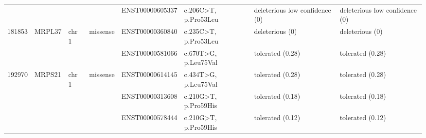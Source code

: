 \documentclass[fleqn,10pt]{wlscirep}
\begin{document}
\begin{landscape}
\begin{table}[]
{\begin{tabular}{|l|l|l|l|l|l|l|l|}
{\color[HTML]{000000} }                         & {\color[HTML]{000000} }                         & {\color[HTML]{000000} }                         & {\color[HTML]{000000} }                           & {\color[HTML]{000000} ENST00000605337}     & {\color[HTML]{000000} c.206C\textgreater{}T, p.Pro53Leu}   & {\color[HTML]{000000} deleterious low confidence (0)}    & deleterious low confidence (0)    \\ \cline{5-8} 
\multirow{-2}{*}{{\color[HTML]{000000} 181853}} & \multirow{-2}{*}{{\color[HTML]{000000} MRPL37}} & \multirow{-2}{*}{{\color[HTML]{000000} chr 1}}  & \multirow{-2}{*}{{\color[HTML]{000000} missense}} & {\color[HTML]{000000} ENST00000360840}     & {\color[HTML]{000000} c.235C\textgreater{}T, p.Pro53Leu}   & {\color[HTML]{000000} deleterious (0)}                   & deleterious (0)                   \\ \hline
{\color[HTML]{000000} }                         & {\color[HTML]{000000} }                         & {\color[HTML]{000000} }                         & {\color[HTML]{000000} }                           & {\color[HTML]{000000} ENST00000581066}     & {\color[HTML]{000000} c.670T\textgreater{}G, p.Leu75Val}   & {\color[HTML]{000000} tolerated (0.28)}                  & tolerated (0.28)                  \\ \cline{5-8} 
\multirow{-2}{*}{{\color[HTML]{000000} 192970}} & \multirow{-2}{*}{{\color[HTML]{000000} MRPS21}} & \multirow{-2}{*}{{\color[HTML]{000000} chr 1}}  & \multirow{-2}{*}{{\color[HTML]{000000} missense}} & {\color[HTML]{000000} ENST00000614145}     & {\color[HTML]{000000} c.434T\textgreater{}G, p.Leu75Val}   & {\color[HTML]{000000} tolerated (0.28)}                  & tolerated (0.28)                  \\ \hline
{\color[HTML]{000000} }                         & {\color[HTML]{000000} }                         & {\color[HTML]{000000} }                         & {\color[HTML]{000000} }                           & {\color[HTML]{000000} ENST00000313608}     & {\color[HTML]{000000} c.210G\textgreater{}T, p.Pro59His}   & {\color[HTML]{000000} tolerated (0.18)}                  & tolerated (0.18)                  \\ \cline{5-8} 
{\color[HTML]{000000} }                         & {\color[HTML]{000000} }                         & {\color[HTML]{000000} }                         & {\color[HTML]{000000} }                           & {\color[HTML]{000000} ENST00000578444}     & {\color[HTML]{000000} c.210G\textgreater{}T, p.Pro59His}   & {\color[HTML]{000000} tolerated (0.12)}                  & tolerated (0.12)                  \\ \cline{5-8} 

\end{tabular}}
\end{table}
\end{landscape}
\end{document}

